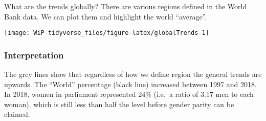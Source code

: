 \documentclass[a4paper,9pt,twocolumn,twoside,printwatermark=false]{pinp}
\begin{document}
What are the trends globally? There are various regions defined in the
World Bank data. We can plot them and highlight the world ``average''.

\begin{Shaded}
\end{Shaded}

\begin{center}\texttt{[image: WiP-tidyverse\_files/figure-latex/globalTrends-1]} \end{center}

\hypertarget{interpretation-5}{%
\subsubsection{Interpretation}\label{interpretation-5}}

The grey lines show that regardless of how we define region the general
trends are upwards. The ``World'' percentage (black line) increased
between 1997 and 2018. In 2018, women in parliament represented 24\%
(i.e.~a ratio of 3.17 men to each woman), which is still less than half
the level before gender parity can be claimed.
\end{document}
